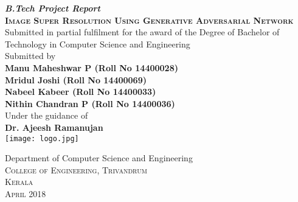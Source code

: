 

	\begin{titlepage}
		\begin{centering}
		 
		\textbf{\textit{\large{B.Tech Project Report}}}\\[0.5cm]
		
		\textsc{\textbf{\LARGE{Image Super Resolution Using Generative Adversarial Network }}}\\[1.0cm]

		\large{Submitted in partial fulfilment for the award of the Degree of Bachelor of Technology in Computer Science and Engineering}\\[1.3cm]

		\large{Submitted by}\\[0.3cm]

		\textbf{Manu Maheshwar P   (Roll No 14400028)}\\
		\textbf{Mridul Joshi     (Roll No 14400069)}\\
		\textbf{Nabeel Kabeer     (Roll No 14400033)}\\
		\textbf{Nithin Chandran P   (Roll No 14400036)}\\[1.2cm]
		
		{Under the guidance of}\\[0.25cm]
		\textbf{\large{Dr. Ajeesh Ramanujan}}\\[0.5cm]

		\texttt{[image: logo.jpg]} 

		Department of Computer Science and Engineering\\
		\textsc{College of Engineering, Trivandrum}\\
		\textsc{Kerala}\\
		\textsc{April 2018}\\
		\vfill %
		\end{centering}
	\end{titlepage}
